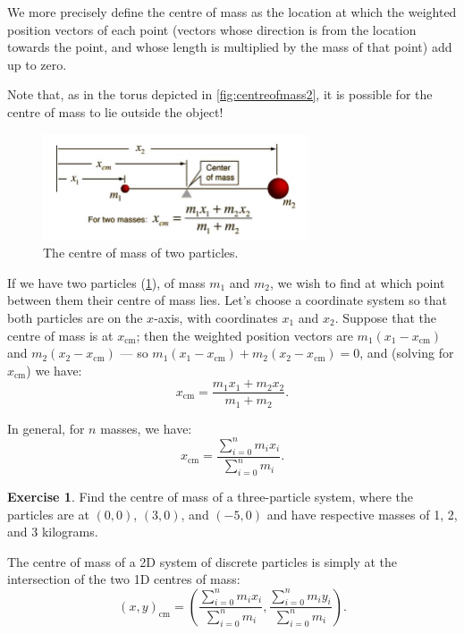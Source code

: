 \documentclass[a4paper]{amsbook}
\newcommand{\cm}{\text{cm}}
\theoremstyle{definition}
\newtheorem{exercise}{Exercise}
\numberwithin{exercise}{chapter}
\numberwithin{exercise}{chapter}
\begin{document}
We more precisely define the centre of mass as the location at which the weighted position vectors of each point (vectors whose direction is
from the location towards the point, and whose length is multiplied by the mass of that point) add up to zero.

Note that, as in the torus depicted in \cref{fig:centreofmass2}, it is possible for the centre of mass to lie outside the object!

\begin{figure}
  \centering
  \includegraphics[width=0.7\textwidth]{centreofmass}
  \caption{The centre of mass of two particles.}\label{fig:centreofmass}
\end{figure}

If we have two particles (\cref{fig:centreofmass}), of mass $ m_1 $ and $ m_2 $, we wish to find at which point between them their centre
of mass lies. Let's choose a coordinate system so that both particles are on the $ x$-axis, with coordinates $ x_1 $ and $ x_2 $. Suppose
that the centre of mass is at $ x_{\cm} $; then the weighted position vectors are $ m_1 (x_1 - x_\cm) $ and $ m_2 (x_2 - x_\cm) $ ---
so $ m_1 (x_1 - x_\cm) + m_2 (x_2 - x_\cm) = 0 $, and (solving for $ x_\cm $) we have:
\begin{equation}
  x_\cm = \frac{m_1 x_1 + m_2 x_2}{m_1 + m_2}.
\end{equation}

In general, for $ n $ masses, we have:
\begin{equation}
  x_\cm = \frac{\sum_{i = 0}^n m_i x_i}{\sum_{i = 0}^n m_i}.
\end{equation}

\begin{exercise}
  Find the centre of mass of a three-particle system, where the particles are at $ (0, 0) $, $ (3, 0) $, and $ (-5, 0) $ and have respective masses
  of 1, 2, and 3 kilograms.
\end{exercise}

The centre of mass of a 2D system of discrete particles is simply at the intersection of the two 1D centres of mass:
\begin{equation}
  (x,y)_\cm = \left(\frac{\sum_{i = 0}^n m_i x_i}{\sum_{i = 0}^n m_i}, \frac{\sum_{i = 0}^n m_i y_i}{\sum_{i = 0}^n m_i} \right).
\end{equation}
\end{document}
